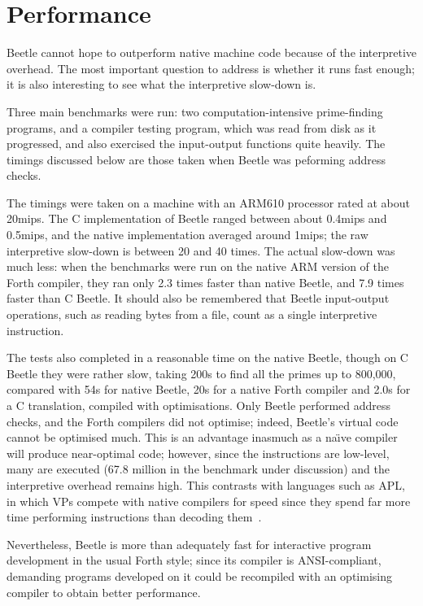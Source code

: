 \documentclass{article}
\begin{document}
\section{Performance}
\label{performance}

Beetle cannot hope to outperform native machine code because of the
interpretive overhead. The most important question to address is whether it
runs fast enough; it is also interesting to see what the interpretive
slow-down is.

Three main benchmarks were run: two computation-intensive prime-finding
programs, and a compiler testing program, which was read from disk as it
progressed, and also exercised the input-output functions quite heavily. The
timings discussed below are those taken when Beetle was peforming address
checks.

The timings were taken on a machine with an ARM610 processor rated at about
20mips. The C implementation of Beetle ranged between about 0.4mips and
0.5mips, and the native implementation averaged around 1mips; the raw
interpretive slow-down is between 20 and 40 times. The actual slow-down was
much less: when the benchmarks were run on the native ARM version of the
Forth compiler, they ran only 2.3 times faster than native Beetle, and 7.9
times faster than C Beetle. It should also be remembered that Beetle
input-output operations, such as reading bytes from a file, count as a single
interpretive instruction.

The tests also completed in a reasonable time on the native Beetle, though on
C Beetle they were rather slow, taking 200s to find all the primes up to
800,000, compared with 54s for native Beetle, 20s for a native Forth compiler
and 2.0s for a C translation, compiled with optimisations. Only Beetle
performed address checks, and the Forth compilers did not optimise; indeed,
Beetle's virtual code cannot be optimised much. This is an advantage inasmuch
as a na\"{\i}ve compiler will produce near-optimal code; however, since the
instructions are low-level, many are executed (67.8 million in the benchmark
under discussion) and the interpretive overhead remains high. This contrasts
with languages such as APL, in which VPs compete with native compilers for
speed since they spend far more time performing instructions than decoding
them~\cite{intcoproc}.

Nevertheless, Beetle is more than adequately fast for interactive program
development in the usual Forth style; since its compiler is ANSI-compliant,
demanding programs developed on it could be recompiled with an optimising
compiler to obtain better performance.
\end{document}
